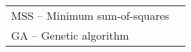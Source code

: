 \begin{thenotations}

  \noindent
  \begin{tabular}{ll}
    MSS -- Minimum sum-of-squares\\
    GA -- Genetic algorithm\\
  \end{tabular}
  
\end{thenotations}
